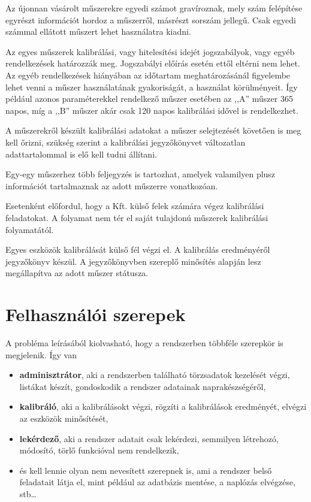 \documentclass[a4paper,12pt]{report}
\begin{document}
Az újonnan vásárolt műszerekre egyedi számot gravíroznak, mely szám felépítése 
egyrészt információt hordoz a műszerről, másrészt sorszám jellegű. Csak egyedi 
számmal ellátott műszert lehet használatra kiadni. 

Az egyes műszerek kalibrálási, vagy hitelesítési idejét jogszabályok, vagy egyéb
rendelkezések határozzák meg. Jogszabályi előírás esetén ettől eltérni nem 
lehet. Az egyéb rendelkezések hiányában az időtartam meghatározásánál figyelembe
lehet venni a műszer használatának gyakoriságát, a használat körülményeit.
Így például azonos paraméterekkel rendelkező műszer esetében az ,,A'' műszer
365 napos, míg a ,,B'' műszer akár csak 120 napos kalibrálási idővel is rendelkezhet.

A műszerekről készült kalibrálási adatokat a műszer selejtezését követően is 
meg kell őrizni, szükség szerint a kalibrálási jegyzőkönyvet változatlan 
adattartalommal is elő kell tudni állítani.

Egy-egy műszerhez több feljegyzés is tartozhat, amelyek valamilyen plusz 
információt tartalmaznak az adott műszerre vonatkozóan. 

Esetenként előfordul, hogy a Kft. külső felek számára végez kalibrálási 
feladatokat. A folyamat nem tér el saját tulajdonú műszerek kalibrálási 
folyamatától.

Egyes eszközök kalibrálását külső fél végzi el. A kalibrálás eredményéről jegyzőkönyv
készül. A jegyzőkönyvben szereplő minősítés alapján lesz megállapítva az adott műszer státusza.

\section{Felhasználói szerepek}
A probléma leírásából kiolvasható, hogy a rendszerben többféle szerepkör is 
megjelenik. Így van
\begin{itemize}
 \item \textbf{adminisztrátor}, aki a rendszerben található törzsadatok 
kezelését végzi, listákat készít, gondoskodik a rendszer adatainak 
naprakészségéről,
\item \textbf{kalibráló}, aki a kalibrálásokt végzi, rögzíti a kalibrálások 
eredményét, elvégzi az eszközök minősítését,
\item \textbf{lekérdező}, aki a rendszer adatait csak lekérdezi, semmilyen 
létrehozó, módosító, törlő funkcióval nem rendelkezik,
\item és kell lennie olyan nem nevesített szerepnek is, ami a rendszer belső 
feladatait látja el, mint például az adatbázis mentése, a naplózás elvégzése, 
stb\dots
\end{itemize}
\end{document}
